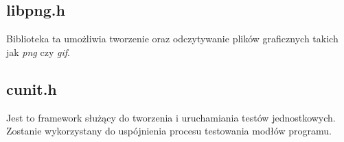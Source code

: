 \documentclass{article}
\begin{document}
\subsection{libpng.h}
Biblioteka ta umożliwia tworzenie oraz odczytywanie plików graficznych takich jak \textit{png} czy \textit{gif}.

\subsection{cunit.h}
Jest to framework służący do tworzenia i uruchamiania testów jednostkowych. Zostanie wykorzystany do uspójnienia procesu testowania modłów programu.
\end{document}
